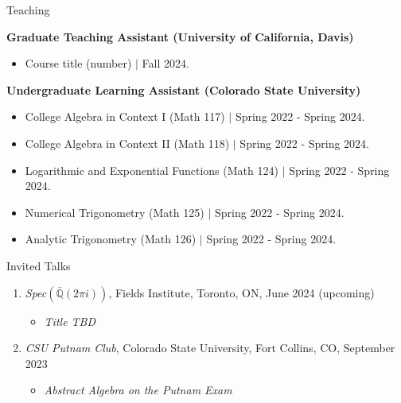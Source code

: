 \documentclass[
	11pt, %
]{resume} %
\newcommand{\Q}{\mathbb{Q}}
\begin{document}
\begin{rSection}{Teaching}


	\textbf{Graduate Teaching Assistant (University of California, Davis)}
	\begin{itemize}
		\item{Course title (number) $\mid$ Fall 2024.}
	\end{itemize}

	\textbf{Undergraduate Learning Assistant (Colorado State University)}
	\begin{itemize}
		\item{College Algebra in Context I (Math 117)  $\mid$ Spring 2022 - Spring 2024.}
		\item{College Algebra in Context II (Math 118) $\mid$ Spring 2022 - Spring 2024.}
		\item{Logarithmic and Exponential Functions (Math 124) $\mid$ Spring 2022 - Spring 2024.}
		\item{Numerical Trigonometry (Math 125) $\mid$ Spring 2022 - Spring 2024.}
		\item{Analytic Trigonometry (Math 126) $\mid$ Spring 2022 - Spring 2024.}
	\end{itemize}
	
\end{rSection}


\begin{rSection}{Invited Talks}

	\begin{enumerate}

		\item \textit{Spec}$(\bar{\Q}(2\pi i))$, Fields Institute, Toronto, ON, June 2024 (upcoming)
		\begin{itemize}
			\item \textit{Title TBD}
		\end{itemize}

		\item \textit{CSU Putnam Club}, Colorado State University, Fort Collins, CO, September 2023
		\begin{itemize}
			\item \textit{Abstract Algebra on the Putnam Exam}
		\end{itemize}

	\end{enumerate}
	
\end{rSection}
\end{document}
